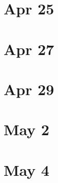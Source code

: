 \documentclass{amsart}
\newcommand{\<}{\langle}
\renewcommand{\>}{\rangle}
\theoremstyle{plain}
\theoremstyle{definition}
\theoremstyle{remark}
\begin{document}
\section{Apr 25}

\section{Apr 27}

\section{Apr 29}

\section{May 2}

\section{May 4}




\newpage
\end{document}

